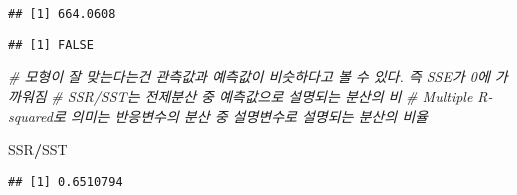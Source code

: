 \documentclass[]{article}
\newenvironment{Shaded}{\begin{snugshade}}{\end{snugshade}}
\newcommand{\KeywordTok}[1]{\textcolor[rgb]{0.13,0.29,0.53}{\textbf{#1}}}
\newcommand{\DecValTok}[1]{\textcolor[rgb]{0.00,0.00,0.81}{#1}}
\newcommand{\StringTok}[1]{\textcolor[rgb]{0.31,0.60,0.02}{#1}}
\newcommand{\CommentTok}[1]{\textcolor[rgb]{0.56,0.35,0.01}{\textit{#1}}}
\newcommand{\OperatorTok}[1]{\textcolor[rgb]{0.81,0.36,0.00}{\textbf{#1}}}
\newcommand{\NormalTok}[1]{#1}
\begin{document}
\begin{Shaded}
\end{Shaded}

\begin{verbatim}
## [1] 664.0608
\end{verbatim}

\begin{Shaded}
\end{Shaded}

\begin{verbatim}
## [1] FALSE
\end{verbatim}

\begin{Shaded}
\begin{Highlighting}[]
\CommentTok{# 모형이 잘 맞는다는건 관측값과 예측값이 비슷하다고 볼 수 있다. 즉 SSE가 0에 가까워짐}
\CommentTok{# SSR/SST는 전제분산 중 예측값으로 설명되는 분산의 비}
\CommentTok{# Multiple R-squared로 의미는 반응변수의 분산 중 설명변수로 설명되는 분산의 비율}

\NormalTok{SSR}\OperatorTok{/}\NormalTok{SST }
\end{Highlighting}
\end{Shaded}

\begin{verbatim}
## [1] 0.6510794
\end{verbatim}
\end{document}
